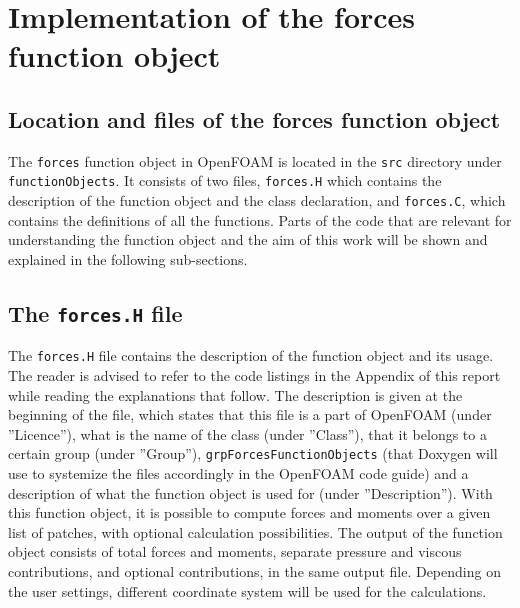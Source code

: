 \section{Implementation of the forces function object}

\subsection{Location and files of the forces function object}
The \texttt{forces} function object in OpenFOAM is located in the \texttt{src} directory under \texttt{functionObjects}. It consists of two files, \texttt{forces.H} which contains the description of the function object and the class declaration, and \texttt{forces.C}, which contains the definitions of all the functions. Parts of the code that are relevant for understanding the function object and the aim of this work will be shown and explained in the following sub-sections. 

\subsection{The \texttt{forces.H} file}
The \texttt{forces.H} file contains the description of the function object and its usage. The reader is advised to refer to the code listings in the Appendix of this report while reading the explanations that follow. The description is given at the beginning of the file, which states that this file is a part of OpenFOAM (under ”Licence”), what is the name of the class (under ”Class”), that it belongs to a certain group (under ”Group”), \texttt{grpForcesFunctionObjects} (that Doxygen will use to systemize the files accordingly in the OpenFOAM code guide) and a description of what the function object is used for (under ”Description”). With this function object, it is possible to compute forces and moments over a given list of patches, with optional calculation possibilities. The output of the function object consists of total forces and moments, separate pressure and viscous contributions, and optional contributions, in the same output file. Depending on the user settings, different coordinate system will be used for the calculations.

